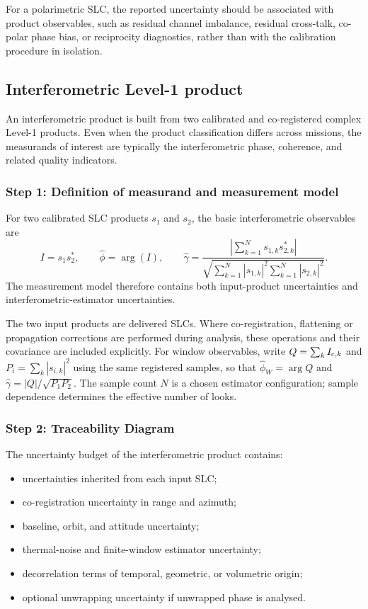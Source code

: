 For a polarimetric \ac{SLC}, the reported uncertainty should be associated with
product observables, such as residual channel imbalance, residual cross-talk,
co-polar phase bias, or reciprocity diagnostics, rather than with the
calibration procedure in isolation.

\subsection{Interferometric Level-1 product}

An interferometric product is built from two calibrated and co-registered
complex Level-1 products. Even when the product classification differs across
missions, the measurands of interest are typically the interferometric phase,
coherence, and related quality indicators.

\subsubsection{Step 1: Definition of measurand and measurement model}

For two calibrated \ac{SLC} products $s_{1}$ and $s_{2}$, the basic
interferometric observables are
\begin{equation}
  I = s_{1}s_{2}^{\ast},
  \qquad
  \hat{\phi} = \arg(I),
  \qquad
  \hat{\gamma} =
  \frac{\left|\sum_{k=1}^{N} s_{1,k}s_{2,k}^{\ast}\right|}
  {\sqrt{\sum_{k=1}^{N}|s_{1,k}|^2\sum_{k=1}^{N}|s_{2,k}|^2}}.
  \label{eq:l1_insar_model}
\end{equation}
The measurement model therefore contains both input-product uncertainties and
interferometric-estimator uncertainties.

The two input products are delivered SLCs. Where co-registration, flattening or
propagation corrections are performed during analysis, these operations and
their covariance are included explicitly. For window observables, write
$Q=\sum_k I_{{\rm c},k}$ and $P_i=\sum_k|s_{i,k}|^2$ using the same registered
samples, so that $\hat\phi_W=\arg Q$ and
$\hat\gamma=|Q|/\sqrt{P_1P_2}$. The sample count $N$ is a chosen estimator
configuration; sample dependence determines the effective number of looks.



\subsubsection{Step 2: Traceability Diagram}

The uncertainty budget of the interferometric product contains:
\begin{itemize}
  \item uncertainties inherited from each input \ac{SLC};
  \item co-registration uncertainty in range and azimuth;
  \item baseline, orbit, and attitude uncertainty;
  \item thermal-noise and finite-window estimator uncertainty;
  \item decorrelation terms of temporal, geometric, or volumetric origin;
  \item optional unwrapping uncertainty if unwrapped phase is analysed.
\end{itemize}

